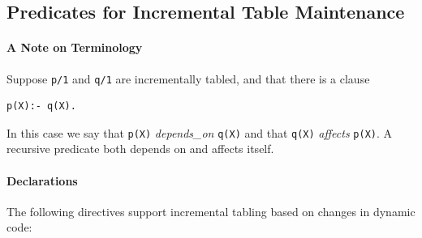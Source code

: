\subsection{Predicates for Incremental Table Maintenance} \label{sec:incr-preds1}

\paragraph{A Note on Terminology}
%
Suppose {\tt p/1} and {\tt q/1} are incrementally tabled, and that
there is a clause
%
\begin{verbatim}
p(X):- q(X).
\end{verbatim}
%
In this case we say that {\tt p(X)} {\em depends\_on} {\tt q(X)} and
that {\tt q(X)} {\em affects} {\tt p(X)}.  A recursive predicate both
depends on and affects itself.


\paragraph{Declarations} The following directives support incremental
tabling based on changes in dynamic code: 

